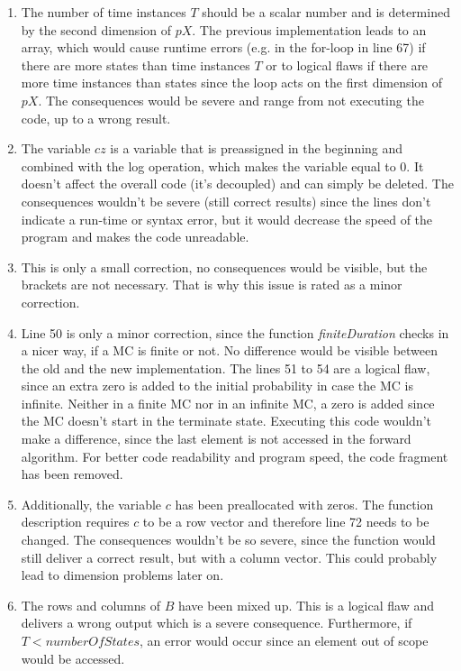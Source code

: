 \begin{enumerate}
\item The number of time instances $T$ should be a scalar number and is determined by the second dimension of $pX$. The previous implementation leads to an array, which would cause runtime errors (e.g. in the for-loop in line 67) if there are more states than time instances $T$ or to logical flaws if there are more time instances than states since the loop acts on the first dimension of $pX$. The consequences would be severe and range from not executing the code, up to a wrong result.
\item The variable $cz$ is a variable that is preassigned in the beginning and combined with the log operation, which makes the variable equal to $0$. It doesn't affect the overall code (it's decoupled) and can simply be deleted. The consequences wouldn't be severe (still correct results) since the lines don't indicate a run-time or syntax error, but it would decrease the speed of the program and makes the code unreadable.
\item This is only a small correction, no consequences would be visible, but the brackets are not necessary. That is why this issue is rated as a minor correction.
\item Line 50 is only a minor correction, since the function \textit{finiteDuration} checks in a nicer way, if a MC is finite or not. No difference would be visible between the old and the new implementation. The lines 51 to 54 are a logical flaw, since an extra zero is added to the initial probability in case the MC is infinite. Neither in a finite MC nor in an infinite MC, a zero is added since the MC doesn't start in the terminate state. Executing this code wouldn't make a difference, since the last element is not accessed in the forward algorithm. For better code readability and program speed, the code fragment has been removed.
\item Additionally, the variable $c$ has been preallocated with zeros. The function description requires $c$ to be a row vector and therefore line 72 needs to be changed. The consequences wouldn't be so severe, since the function would still deliver a correct result, but with a column vector. This could probably lead to dimension problems later on.
\item The rows and columns of $B$ have been mixed up. This is a logical flaw and delivers a wrong output which is a severe consequence. Furthermore, if $T<numberOfStates$, an error would occur since an element out of scope would be accessed.

\end{enumerate}
